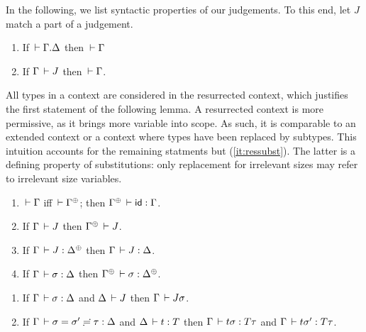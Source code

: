 \documentclass[acmlarge,review,anonymous]{acmart}\settopmatter{printfolios=true}
\begin{document}

In the following, we list syntactic properties of our judgements.  To
this end, let $J$ %
match a part of a judgement.

\begin{lemma}
\label{lem:cxtwf}\bla
  \begin{enumerate}
  \item If\/ $\,\vdash \Gamma. \Delta$ then $\,\vdash \Gamma$
  \item If\/ $\Gamma \,\vdash J$ then $\,\vdash \Gamma$.
  \end{enumerate}
\end{lemma}

All types in a context are considered in the resurrected context,
which justifies the first statement of the following lemma.
A resurrected context is more permissive, as it brings more variable
into scope.  As such, it is comparable to an extended context or a
context where types have been replaced by subtypes.  This intuition
accounts for the remaining statments but (\ref{it:ressubst}).  The
latter is a defining property of substitutions: only replacement for
irrelevant sizes may refer to irrelevant size variables.
\begin{lemma}[Resurrection]
\label{lem:res} \bla
\begin{enumerate}
\item \label{it:reswf} $\,\vdash \Gamma$ iff $\der \resurrect\Gamma$;  then $\resurrect \Gamma \der \sid : \Gamma$.
\item If\/ $\Gamma \,\vdash J$ then $\resurrect \Gamma \der J$.
\item If\/ $\Gamma \der J : \resurrect \Delta$ %
  then $\Gamma \,\vdash J : \Delta$.
\item \label{it:ressubst} If\/ $\Gamma \,\vdash \sigma : \Delta$ %
  then $\resurrect\Gamma \der \sigma : \resurrect\Delta$.
\end{enumerate}
\end{lemma}

\begin{lemma}[Substitution]
\label{lem:sub}\bla
\begin{enumerate}
\item
  If\/ $\Gamma \,\vdash \sigma : \Delta$ and $\Delta \,\vdash J$ then $\Gamma \,\vdash J\sigma$.
\item
  If\/ $\Gamma \,\vdash \sigma = \sigma' \risingdotseq \tau : \Delta$ and $\Delta \,\vdash t : T$ then
  $\Gamma \,\vdash t\sigma : T\tau$ and $\Gamma \,\vdash t\sigma' : T\tau$.
\end{enumerate}
\end{lemma}
\end{document}
